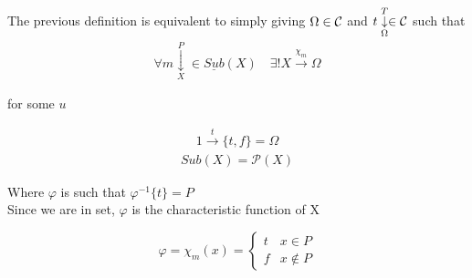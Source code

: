 \begin{definition}
  \label{subobject_classifier_def}
  The previous definition is equivalent to simply giving 
  $\Omega \in \mathcal{C}$
  and 
  $t \underset{\Omega}{\overset{T}{\downarrow}} \in \mathcal{C}$
  such that 
  \begin{align*}
    \forall 
    m \underset{X}{\overset{P}{\downarrow}}
    \in \underline{Sub}(X) \quad
    \exists! 
    X \overset{\chi_{m}}{\longrightarrow} \Omega
  \end{align*}  
  \begin{center}
    \end{center}
  for some $u$
\end{definition}

\begin{example}
\begin{align*}
  1 \overset{t}{\longrightarrow} \{t, f\} = \Omega
\end{align*}
\begin{align*}
  Sub(X) = \mathcal{P}(X)
\end{align*}

\begin{center}
  \end{center}

Where $\varphi$ is such that $\varphi^{-1}\{t\} = P$ \\
Since we are in set, $\varphi$ is the characteristic function of X

\begin{equation*}
 \varphi = \chi_m(x) = 
  \begin{cases}
    t & x \in P \\
    f & x \notin P 
  \end{cases}
\end{equation*}

\end{example}


